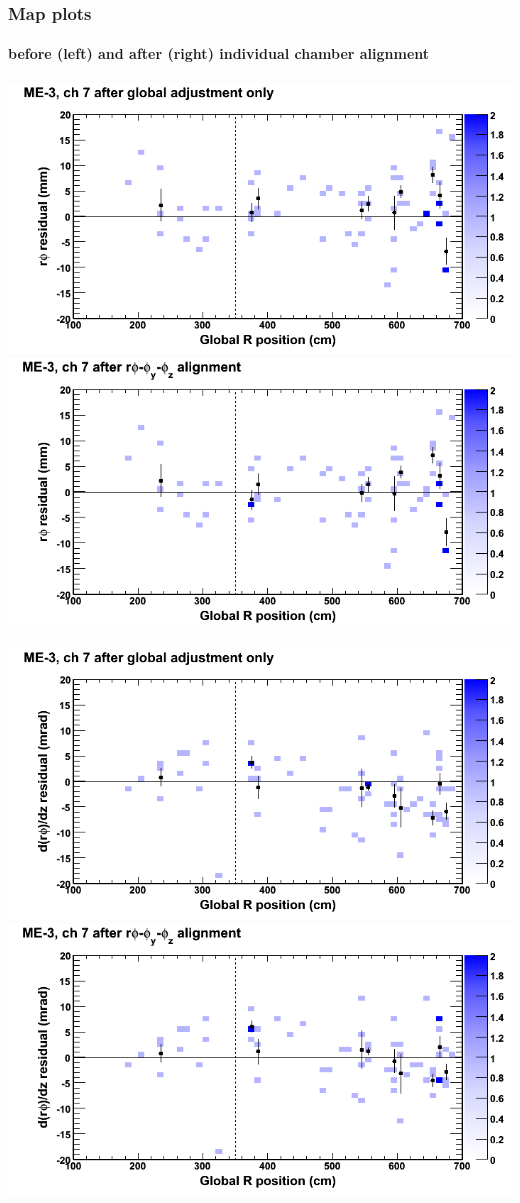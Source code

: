 \documentclass[compress]{beamer}
\begin{document}
\begin{frame}
\frametitle{Map plots}
\framesubtitle{before (left) and after (right) individual chamber alignment}
\includegraphics[width=0.5\linewidth]{ringmapplots_3dof/before_CSCvsr_mem3ch07_x.png} \includegraphics[width=0.5\linewidth]{ringmapplots_3dof/after_CSCvsr_mem3ch07_x.png}

\includegraphics[width=0.5\linewidth]{ringmapplots_3dof/before_CSCvsr_mem3ch07_dxdz.png} \includegraphics[width=0.5\linewidth]{ringmapplots_3dof/after_CSCvsr_mem3ch07_dxdz.png}
\end{frame}
\end{document}
